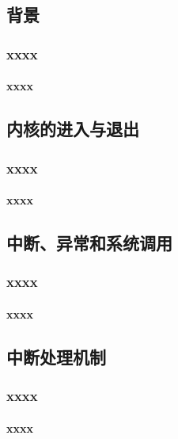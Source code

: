 \subsection{背景} %
\begin{frame}
	\frametitle{xxxx}
	\framesubtitle{xxxx}
\end{frame}

\subsection{内核的进入与退出}
\begin{frame}
	\frametitle{xxxx}
	\framesubtitle{xxxx}
\end{frame}

\subsection{中断、异常和系统调用}
\begin{frame}
	\frametitle{xxxx}
	\framesubtitle{xxxx}
\end{frame}

\subsection{中断处理机制}

\begin{frame}
	\frametitle{xxxx}
	\framesubtitle{xxxx}
\end{frame}



